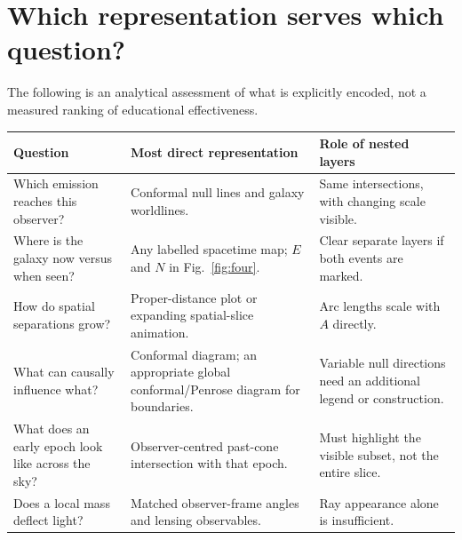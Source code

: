 \documentclass[11pt,a4paper]{article}
\begin{document}
\clearpage
\section{Which representation serves which question?}
The following is an analytical assessment of what is explicitly encoded,
not a measured ranking of educational effectiveness.

\begin{center}\small
\begin{tabular}{@{}p{.25\linewidth}p{.33\linewidth}p{.34\linewidth}@{}}
\toprule
Question & Most direct representation & Role of nested layers\\
\midrule
{\raggedright Which emission reaches this observer?\par} & {\raggedright Conformal null lines and galaxy worldlines.\par} & {\raggedright Same intersections, with changing scale visible.\par}\\[4pt]
{\raggedright Where is the galaxy now versus when seen?\par} & {\raggedright Any labelled spacetime map; $E$ and $N$ in Fig.~\ref{fig:four}.\par} & {\raggedright Clear separate layers if both events are marked.\par}\\[4pt]
{\raggedright How do spatial separations grow?\par} & {\raggedright Proper-distance plot or expanding spatial-slice animation.\par} & {\raggedright Arc lengths scale with $A$ directly.\par}\\[4pt]
{\raggedright What can causally influence what?\par} & {\raggedright Conformal diagram; an appropriate global conformal/Penrose diagram for boundaries.\par} & {\raggedright Variable null directions need an additional legend or construction.\par}\\[4pt]
{\raggedright What does an early epoch look like across the sky?\par} & {\raggedright Observer-centred past-cone intersection with that epoch.\par} & {\raggedright Must highlight the visible subset, not the entire slice.\par}\\[4pt]
{\raggedright Does a local mass deflect light?\par} & {\raggedright Matched observer-frame angles and lensing observables.\par} & {\raggedright Ray appearance alone is insufficient.\par}\\[4pt]

\end{tabular}
\end{center}
\end{document}
